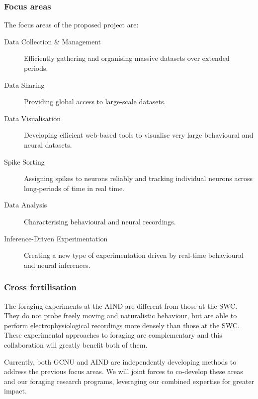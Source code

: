 \subsubsection{Focus areas}

The focus areas of the proposed project are:

\begin{description}

    \item[Data Collection \& Management] Efficiently gathering and organising
        massive datasets over extended periods.

    \item[Data Sharing] Providing global access to large-scale datasets.

    \item[Data Visualisation] Developing efficient web-based tools to visualise
        very large behavioural and neural datasets.

    \item[Spike Sorting] Assigning spikes to neurons reliably and tracking
        individual neurons across long-periods of time in real time.

    \item[Data Analysis] Characterising behavioural and neural recordings.

    \item[Inference-Driven Experimentation] Creating a new type of
        experimentation driven by real-time behavioural and neural inferences.

\end{description}

\subsubsection{Cross fertilisation}

The foraging experiments at the AIND are different from those at the SWC. They
do not probe freely moving and naturalistic behaviour, but are able to perform
electrophysiological recordings more densely than those at the SWC.
%
These experimental approaches to foraging are complementary and this
collaboration will greatly benefit both of them.

Currently, both GCNU and AIND are independently developing methods to address
the previous focus areas. We will joint forces to co-develop these areas and
our foraging research programs, leveraging our combined expertise for greater
impact.
